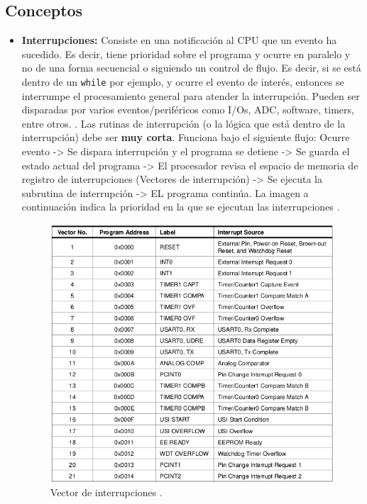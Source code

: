 \subsection{Conceptos}
\begin{itemize}
    \item \textbf{Interrupciones:} Consiste en una notificación al CPU que un evento ha sucedido. Es decir, tiene prioridad sobre el programa y ocurre en paralelo y no de una forma secuencial o siguiendo un control de flujo. Es decir, si se está dentro de un \texttt{while} por ejemplo, y ocurre el evento de interés, entonces se interrumpe el procesamiento general para atender la interrupción. Pueden ser disparadas por varios eventos/periféricos como I/Os, ADC, software, timers, entre otros. \cite{presentacion}. Las rutinas de interrupción (o la lógica que está dentro de la interrupción) debe ser \textbf{muy corta}. Funciona bajo el siguiente flujo: Ocurre evento -> Se dispara interrupción y el programa se detiene -> Se guarda el estado actual del programa -> El procesador revisa el espacio de memoria de registro de interrupciones (Vectores de interrupción) -> Se ejecuta la subrutina de interrupción -> EL programa continúa. La imagen a continuación indica la prioridad en la que se ejecutan las interrupciones \cite{presentacion}. 
\begin{figure}[H]
\centering
\includegraphics[scale=0.9]{./images/vector.png} 
\caption{Vector de interrupciones \cite{datasheet}.}
\label{f1}
\end{figure}


\end{itemize}
